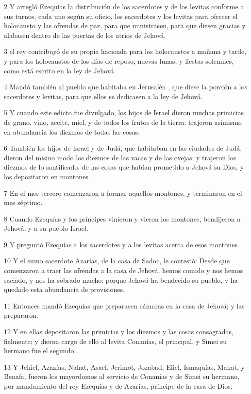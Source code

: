 \par 2 Y arregló Ezequías la distribución de los sacerdotes y de los levitas conforme a sus turnos, cada uno según su oficio, los sacerdotes y los levitas para ofrecer el holocausto y las ofrendas de paz, para que ministrasen, para que diesen gracias y alabasen dentro de  las puertas de los atrios de Jehová.
\par 3 el rey contribuyó de su propia hacienda para los holocaustos a mañana y tarde, y para los holocaustos de los días de reposo, nuevas lunas, y fiestas solemnes, como está escrito en la ley de Jehová. 
\par 4 Mandó también al pueblo que habitaba en Jerusalén , que diese la porción a los sacerdotes y levitas, para que ellos se dedicasen a la ley de Jehová.
\par 5 Y cuando este edicto fue divulgado, los hijos de Israel dieron muchas primicias de grano, vino, aceite, miel, y de todos los frutos de la tierra: trajeron asimismo en abundancia los diezmos de todas las cosas. 
\par 6 También los hijos de Israel y de Judá, que habitaban en las ciudades de Judá, dieron del mismo modo los diezmos de las vacas y de las ovejas; y trajeron los diezmos de lo santificado, de las cosas que habían prometido a Jehová su Dios, y los depositaron en montones.
\par 7 En el mes tercero comenzaron a formar aquellos montones, y terminaron en el mes séptimo.
\par 8 Cuando Ezequías y los príncipes vinieron y vieron los montones, bendijeron a Jehová, y a su pueblo Israel.
\par 9 Y preguntó Ezequías a los sacerdotes y a los levitas acerca de esos montones.
\par 10 Y  el sumo sacerdote Azarías, de la casa de Sadoc, le contestó: Desde que comenzaron a traer las ofrendas a la casa de Jehová, hemos comido y nos hemos saciado, y nos ha sobrado mucho: porque Jehová ha bendecido su pueblo, y ha quedado esta abundancia de provisiones.
\par 11 Entonces mandó Ezequías que preparasen cámaras en la casa de Jehová; y las prepararon.
\par 12 Y en ellas depositaron las primicias y los diezmos y las cosas consagradas, fielmente; y dieron cargo de ello al levita Conanías, el principal, y Simei su hermano fue el segundo.
\par 13 Y Jehiel, Azazías, Nahat, Asael, Jerimot, Jozabad, Eliel, Ismaquías, Mahat, y Benaía, fueron los mayordomos al servicio de Conanías y de Simei su hermano, por mandamiento del rey Ezequías y de Azarías, príncipe de la casa de Dios.
